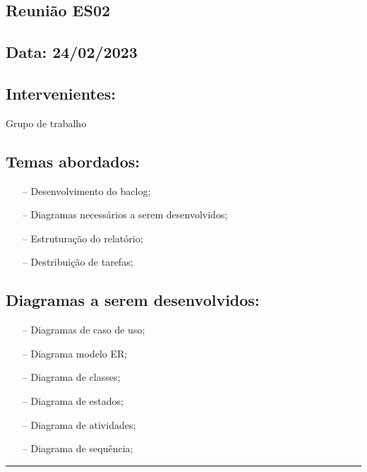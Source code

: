\subsection{Reunião ES02}\label{reuniaoES02}

\subsection*{Data: 24/02/2023}


\subsection*{Intervenientes:}
Grupo de trabalho

\subsection*{Temas abordados:}
\begin{itemize}
\item[--] Desenvolvimento do baclog;
\item[--] Diagramas necessários a serem desenvolvidos;
\item[--] Estruturação do relatório;
\item[--] Destribuição de tarefas;
\end{itemize}

\subsection*{Diagramas a serem desenvolvidos:}

\begin{itemize}
    \item[--] Diagramas de caso de uso;
    \item[--] Diagrama modelo ER;
    \item[--] Diagrama de classes;
    \item[--] Diagrama de estados;
    \item[--] Diagrama de atividades;
    \item[--] Diagrama de sequência;
    \end{itemize}

\noindent \rule{\linewidth}{0.4pt}
\newline
